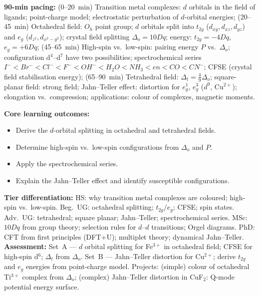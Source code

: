 \documentclass[11pt,a4paper]{article}
\begin{document}
\begin{tcolorbox}[chembox, title={Module~III.3 / L08: Crystal Field Theory}]
\textbf{90-min pacing:} (0--20~min) Transition metal complexes: $d$ orbitals in the field of ligands; point-charge model; electrostatic perturbation of $d$-orbital energies; (20--45~min) Octahedral field: $O_h$ point group; $d$ orbitals split into $t_{2g}$ ($d_{xy},d_{xz},d_{yz}$) and $e_g$ ($d_{z^2},d_{x^2-y^2}$); crystal field splitting $\Delta_o=10Dq$; energy: $t_{2g}=-4Dq$, $e_g=+6Dq$; (45--65~min) High-spin vs.\ low-spin: pairing energy $P$ vs.\ $\Delta_o$; configuration d$^4$--d$^7$ have two possibilities; spectrochemical series $I^-<Br^-<Cl^-<F^-<OH^-<H_2O<NH_3<en<CO<CN^-$; CFSE (crystal field stabilisation energy); (65--90~min) Tetrahedral field: $\Delta_t=\tfrac{4}{9}\Delta_o$; square-planar field: strong field; Jahn--Teller effect: distortion for $e_g^1$, $e_g^3$ ($d^9$, Cu$^{2+}$); elongation vs.\ compression; applications: colour of complexes, magnetic moments.

\medskip\textbf{Core learning outcomes:}
\begin{itemize}[leftmargin=1.4em,topsep=2pt,itemsep=1pt]
  \item Derive the $d$-orbital splitting in octahedral and tetrahedral fields.
  \item Determine high-spin vs.\ low-spin configurations from $\Delta_o$ and $P$.
  \item Apply the spectrochemical series.
  \item Explain the Jahn--Teller effect and identify susceptible configurations.
\end{itemize}
\medskip\textbf{Tier differentiation:}
HS: why transition metal complexes are coloured; high-spin vs.\ low-spin.
Beg.\ UG: octahedral splitting; $t_{2g}/e_g$; CFSE; spin states.
Adv.\ UG: tetrahedral; square planar; Jahn--Teller; spectrochemical series.
MSc: $10Dq$ from group theory; selection rules for $d$--$d$ transitions; Orgel diagrams.
PhD: CFT from first principles (DFT+U); multiplet theory; dynamical Jahn--Teller.
\medskip\textbf{Assessment:}
Set~A --- $d$ orbital splitting for Fe$^{3+}$ in octahedral field; CFSE for high-spin d$^6$; $\Delta_t$ from $\Delta_o$.
Set~B --- Jahn--Teller distortion for Cu$^{2+}$; derive $t_{2g}$ and $e_g$ energies from point-charge model.
Projects: (simple) colour of octahedral Ti$^{3+}$ complex from $\Delta_o$; (complex) Jahn--Teller distortion in CuF$_2$: Q-mode potential energy surface.
\end{tcolorbox}
\end{document}
